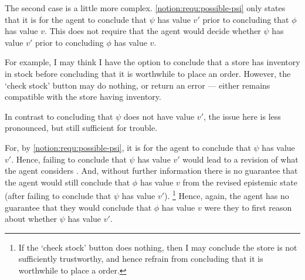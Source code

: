 \begin{note}
  The second case is a little more complex.
  \ref{notion:requ:possible-psi} only states that it is \epVAd{} for the agent to conclude that \(\psi\) has value \(v'\) prior to concluding that \(\phi\) has value \(v\).
  This does not require that the agent would decide whether \(\psi\) has value \(v'\) prior to concluding \(\phi\) has value \(v\).

  For example, I may think I have the option to conclude that a store has inventory in stock before concluding that it is worthwhile to place an order.
  However, the `check stock' button may do nothing, or return an error --- either remains compatible with the store having inventory.

  In contrast to concluding that \(\psi\) does not have value \(v'\), the issue here is less pronounced, but still sufficient for trouble.

  For, by \ref{notion:requ:possible-psi}, it is \epVAd{} for the agent to conclude that \(\psi\) has value \(v'\).
  Hence, failing to conclude that \(\psi\) has value \(v'\) would lead to a revision of what the agent considers \epVAd{}.
  And, without further information there is no guarantee that the agent would still conclude that \(\phi\) has value \(v\) from the revised epistemic state (after failing to conclude that \(\psi\) has value \(v'\)).\nolinebreak
  \footnote{
    If the `check stock' button does nothing, then I may conclude the store is not sufficiently trustworthy, and hence refrain from concluding that it is worthwhile to place a order.
  }
  Hence, again, the agent has no guarantee that they would conclude that \(\phi\) has value \(v\) were they to first reason about whether \(\psi\) has value \(v'\).
\end{note}

